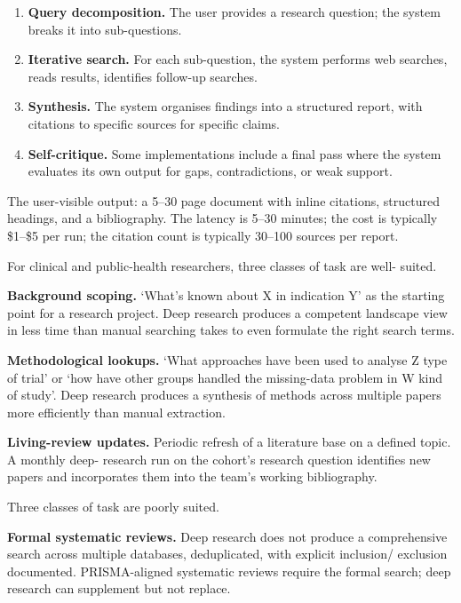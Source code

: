 \documentclass[
  letterpaper,
  11pt]{scrbook}
\providecommand{\tightlist}{%
  \setlength{\itemsep}{0pt}\setlength{\parskip}{0pt}}
\begin{document}
\begin{enumerate}
\def\labelenumi{\arabic{enumi}.}
\tightlist
\item
  \textbf{Query decomposition.} The user provides a research question;
  the system breaks it into sub-questions.
\item
  \textbf{Iterative search.} For each sub-question, the system performs
  web searches, reads results, identifies follow-up searches.
\item
  \textbf{Synthesis.} The system organises findings into a structured
  report, with citations to specific sources for specific claims.
\item
  \textbf{Self-critique.} Some implementations include a final pass
  where the system evaluates its own output for gaps, contradictions, or
  weak support.
\end{enumerate}

The user-visible output: a 5--30 page document with inline citations,
structured headings, and a bibliography. The latency is 5--30 minutes;
the cost is typically \$1--\$5 per run; the citation count is typically
30--100 sources per report.

For clinical and public-health researchers, three classes of task are
well- suited.

\textbf{Background scoping.} `What's known about X in indication Y' as
the starting point for a research project. Deep research produces a
competent landscape view in less time than manual searching takes to
even formulate the right search terms.

\textbf{Methodological lookups.} `What approaches have been used to
analyse Z type of trial' or `how have other groups handled the
missing-data problem in W kind of study'. Deep research produces a
synthesis of methods across multiple papers more efficiently than manual
extraction.

\textbf{Living-review updates.} Periodic refresh of a literature base on
a defined topic. A monthly deep- research run on the cohort's research
question identifies new papers and incorporates them into the team's
working bibliography.

Three classes of task are poorly suited.

\textbf{Formal systematic reviews.} Deep research does not produce a
comprehensive search across multiple databases, deduplicated, with
explicit inclusion/ exclusion documented. PRISMA-aligned systematic
reviews require the formal search; deep research can supplement but not
replace.
\end{document}
